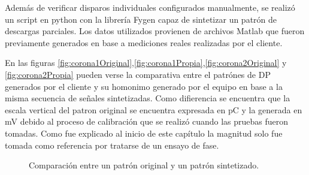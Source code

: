 \vspace{5mm}

Además de verificar disparos individuales configurados manualmente, se realizó un script en python con la librería Fygen \citep{fygenWeb:1} capaz de sintetizar un patrón de descargas parciales. Los datos utilizados provienen de archivos Matlab que fueron previamente generados en base a mediciones reales realizadas por el cliente.

En las figuras \ref{fig:corona1Original},\ref{fig:corona1Propia},\ref{fig:corona2Original} y \ref{fig:corona2Propia} pueden verse la comparativa entre el patrónes de DP generados por el cliente y su homonimo generado por el equipo en base a la misma secuencia de señales sintetizadas. Como difierencia se encuentra que la escala vertical del patron original se encuentra expresada en pC y la generada en mV debido al proceso de calibración que se realizó cuando las pruebas fueron tomadas. Como fue explicado al inicio de este capítulo la magnitud solo fue tomada como referencia por tratarse de un ensayo de fase.

\vspace{5mm}

\begin{figure}[htp] 
    \centering
    \hfill%
    \caption{Comparación entre un patrón original y un patrón sintetizado.}
\end{figure}

